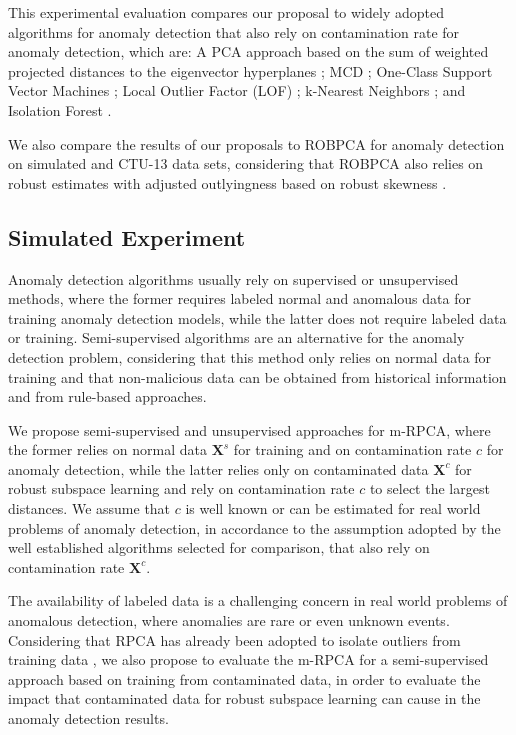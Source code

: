 This experimental evaluation compares our proposal to widely adopted algorithms for anomaly detection that also rely on contamination rate for anomaly detection, which are: A PCA approach based on the sum of weighted projected distances to the eigenvector hyperplanes \cite{shyu2003novel}; MCD \cite{rousseeuw1984mcd,rousseeuw1999fastmcd}; One-Class Support Vector Machines \cite{scholkopf2001estimating}; Local Outlier Factor (LOF) \cite{breunig2000lof}; k-Nearest Neighbors \cite{angiulli2002fast}; and Isolation Forest \cite{liu2008isolation}.

We also compare the results of our proposals to ROBPCA for anomaly detection on simulated and CTU-13 data sets, considering that ROBPCA also relies on robust estimates with adjusted outlyingness based on robust skewness \cite{hubert2009robustskewed}.

\subsection{Simulated Experiment}
\label{sec:4_SimulatedScenario}

Anomaly detection algorithms usually rely on supervised or unsupervised methods, where the former requires labeled normal and anomalous data for training anomaly detection models, while the latter does not require labeled data or training. Semi-supervised algorithms are an alternative for the anomaly detection problem, considering that this method only relies on normal data for training and that non-malicious data can be obtained from historical information and from rule-based approaches. 

We propose semi-supervised and unsupervised approaches for m-RPCA, where the former relies on normal data $\pmb{X}^s$ for training and on contamination rate $c$ for anomaly detection, while the latter relies only on contaminated data $\pmb{X}^c$ for robust subspace learning and rely on contamination rate $c$ to select the largest distances. We assume that $c$ is well known or can be estimated for real world problems of anomaly detection, in accordance to the assumption adopted by the well established algorithms \cite{zhao2019pyod} selected for comparison, that also rely on contamination rate $\pmb{X}^c$.

The availability of labeled data is a challenging concern in real world problems of anomalous detection, where anomalies are rare or even unknown events. Considering that RPCA has already been adopted to isolate outliers from training data \cite{zhou2017anomaly}, we also propose to evaluate the m-RPCA for a semi-supervised approach based on training from contaminated data, in order to evaluate the impact that contaminated data for robust subspace learning can cause in the anomaly detection results.

